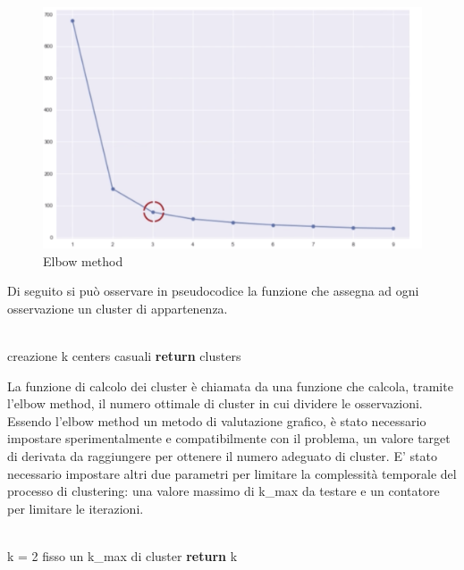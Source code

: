 \documentclass[10pt,a4paper]{report}
\begin{document}
		\begin{figure}[H]
		\centering
		\includegraphics[scale=0.5]{elbow_method.png}
		\caption{Elbow method}
		\end{figure}
		
		Di seguito si può osservare in pseudocodice la funzione che assegna ad ogni osservazione un cluster di appartenenza.\\
		\\
		\begin{algorithm}[H]
		creazione k centers casuali\;
		\textbf{return} clusters
		\end{algorithm}
		
		La funzione di calcolo dei cluster è chiamata da una funzione che calcola, tramite l'elbow method, il numero ottimale di cluster in cui dividere le osservazioni. Essendo l'elbow method un 
		metodo di valutazione grafico, è stato necessario impostare sperimentalmente e compatibilmente con il problema, un valore target di derivata da raggiungere per ottenere il numero adeguato di cluster. 
		E' stato necessario impostare altri due parametri per limitare la complessità temporale del processo di clustering: una valore massimo di k\_{max} da testare e un contatore per limitare le iterazioni.  \\
		\\
		\begin{algorithm}[H]
		k = 2\;
		fisso un k\_{max} di cluster\;
		\textbf{return} k
		\end{algorithm}
		
\end{document}
